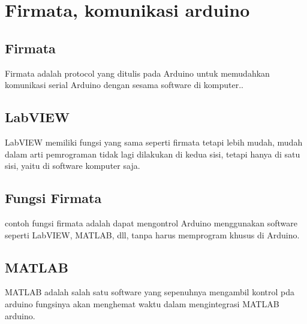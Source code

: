 
\section{Firmata, komunikasi arduino}

	\subsection{Firmata}
	Firmata adalah protocol yang ditulis pada Arduino untuk memudahkan komunikasi serial Arduino dengan sesama software di komputer..
	
	
	\subsection{LabVIEW}
	LabVIEW memiliki fungsi yang sama seperti firmata tetapi lebih mudah, mudah dalam arti pemrograman tidak lagi dilakukan di kedua sisi,
	tetapi hanya di satu sisi, yaitu di software komputer saja.
	
	\subsection{Fungsi Firmata}
	contoh fungsi firmata adalah dapat mengontrol Arduino menggunakan software seperti LabVIEW, MATLAB, dll, tanpa harus memprogram khusus di Arduino.
	
	\subsection{MATLAB}
	MATLAB adalah salah satu software yang sepenuhnya mengambil kontrol pda arduino fungsinya akan menghemat waktu dalam mengintegrasi MATLAB arduino.
	
	